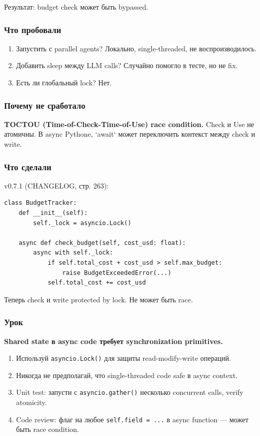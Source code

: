 Результат: budget check может быть bypassed.

\subsubsection*{Что пробовали}
\begin{enumerate}
\item Запустить с parallel agents? Локально, single-threaded, не воспроизводилось.
\item Добавить sleep между LLM calls? Случайно помогло в тесте, но не fix.
\item Есть ли глобальный lock? Нет.
\end{enumerate}

\subsubsection*{Почему не сработало}
\textbf{TOCTOU (Time-of-Check-Time-of-Use) race condition.} Check и Use не атомичны. В async Pythone, `await` может переключить контекст между check и write.

\subsubsection*{Что сделали}
v0.7.1 (CHANGELOG, стр. 263):

\begin{verbatim}
class BudgetTracker:
    def __init__(self):
        self._lock = asyncio.Lock()

    async def check_budget(self, cost_usd: float):
        async with self._lock:
            if self.total_cost + cost_usd > self.max_budget:
                raise BudgetExceededError(...)
            self.total_cost += cost_usd
\end{verbatim}

Теперь check и write protected by lock. Не может быть race.

\subsubsection*{Урок}
\textbf{Shared state в async code требует synchronization primitives.}

\begin{enumerate}
\item Используй \texttt{asyncio.Lock()} для защиты read-modify-write операций.
\item Никогда не предполагай, что single-threaded code safe в async context.
\item Unit test: запусти с \texttt{asyncio.gather()} несколько concurrent calls, verify atomicity.
\item Code review: флаг на любое \texttt{self.field = ...} в async function --- может быть race condition.
\end{enumerate}

